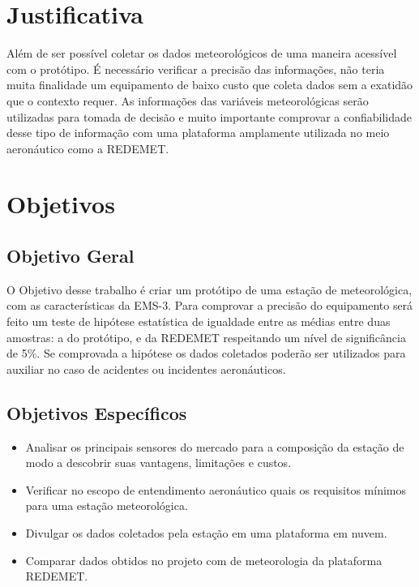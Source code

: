 \section{Justificativa}

Além de ser possível coletar os dados meteorológicos de uma maneira acessível com o protótipo. É necessário verificar a precisão das informações, não teria muita finalidade um equipamento de baixo custo que coleta dados sem a exatidão que o contexto requer. As informações das variáveis meteorológicas serão utilizadas para tomada de decisão e muito importante comprovar a confiabilidade desse tipo de informação com uma plataforma amplamente utilizada no meio aeronáutico como a REDEMET.

\section{Objetivos}

\subsection{Objetivo Geral}

O Objetivo desse trabalho é criar um protótipo de uma estação de meteorológica, com as características da EMS-3. Para comprovar a precisão do equipamento será feito um teste de hipótese estatística de igualdade entre as médias entre duas amostras: a do protótipo, e da REDEMET respeitando um nível de significância de 5\%. Se comprovada a hipótese os dados coletados poderão ser utilizados para auxiliar no caso de acidentes ou incidentes aeronáuticos.


\subsection{Objetivos Específicos}

\begin{itemize}
    \item Analisar os principais sensores do mercado para a composição da estação de modo a descobrir suas vantagens, limitações e custos.
    \item Verificar no escopo de entendimento aeronáutico quais os requisitos mínimos para uma estação meteorológica. 
    \item Divulgar os dados coletados pela estação em uma plataforma em nuvem.
    \item Comparar dados obtidos no projeto com de meteorologia da plataforma REDEMET.
\end{itemize}

